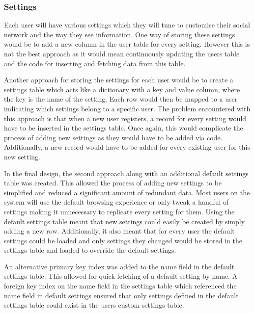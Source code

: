 \subsubsection{Settings}
Each user will have various settings which they will tune to customise their social network and the way they see information. One way of storing these settings would be to add a new column in the user table for every setting. However this is not the best approach as it would mean continuously updating the users table and the code for inserting and fetching data from this table.

Another approach for storing the settings for each user would be to create a settings table which acts like a dictionary with a key and value column, where the key is the name of the setting. Each row would then be mapped to a user indicating which settings belong to a specific user. The problem encountered with this approach is that when a new user registers, a record for every setting would have to be inserted in the settings table. Once again, this would complicate the process of adding new settings as they would have to be added via code. Additionally, a new record would have to be added for every existing user for this new setting.

In the final design, the second approach along with an additional default settings table was created. This allowed the process of adding new settings to be simplified and reduced a significant amount of redundant data. Most users on the system will use the default browsing experience or only tweak a handful of settings making it unnecessary to replicate every setting for them. Using the default settings table meant that new settings could easily be created by simply adding a new row. Additionally, it also meant that for every user the default settings could be loaded and only settings they changed would be stored in the settings table and loaded to override the default settings.

An alternative primary key index was added to the name field in the default settings table. This allowed for quick fetching of a default setting by name. A foreign key index on the name field in the settings table which referenced the name field in default settings ensured that only settings defined in the default settings table could exist in the users custom settings table.

